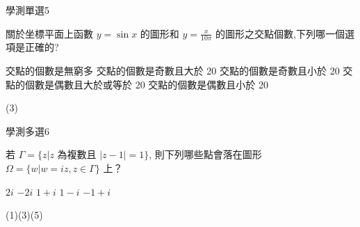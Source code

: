     \begin{QUESTION}
        \begin{ExamInfo}{96}{學測}{單選}{5}
        \end{ExamInfo}
        \begin{ExamAnsRateInfo}{47}{67}{46}{28}
        \end{ExamAnsRateInfo}
        \begin{QBODY}
            關於坐標平面上函數 $y = \sin x$ 的圖形和 $y = \frac{x}{10\pi}$ 的圖形之交點個數,下列哪一個選項是正確的? 
			\begin{QOPS}
				\QOP 交點的個數是無窮多 
				\QOP 交點的個數是奇數且大於 20 
				\QOP 交點的個數是奇數且小於 20 
				\QOP 交點的個數是偶數且大於或等於 20 
				\QOP 交點的個數是偶數且小於 20
			\end{QOPS}
        \end{QBODY}
        \begin{QFROMS}
        \end{QFROMS}
        \begin{QTAGS}\end{QTAGS}
        \begin{QANS}
            (3)
        \end{QANS}
        \begin{QSOLLIST}
        \end{QSOLLIST}
        \begin{QEMPTYSPACE}
        \end{QEMPTYSPACE}
    \end{QUESTION}
    \begin{QUESTION}
        \begin{ExamInfo}{96}{學測}{多選}{6}
        \end{ExamInfo}
        \begin{ExamAnsRateInfo}{19}{35}{12}{10}
        \end{ExamAnsRateInfo}
        \begin{QBODY}
            若 $\Gamma = \{ z|z$ 為複數且 $|z - 1|=1\}$, 則下列哪些點會落在圖形 $\Omega =\{w|w=iz,z \in \Gamma \}$ 上？  
			\begin{QOPS} 
				\QOP $2i$    \QOP $-2i$ 
				\QOP $1+i$ 
				\QOP $1-i$ 
				\QOP $-1+i$
			\end{QOPS}
        \end{QBODY}
        \begin{QFROMS}
        \end{QFROMS}
        \begin{QTAGS}\end{QTAGS}
        \begin{QANS}
            (1)(3)(5)
        \end{QANS}
        \begin{QSOLLIST}
        \end{QSOLLIST}
        \begin{QEMPTYSPACE}
        \end{QEMPTYSPACE}
    \end{QUESTION}
